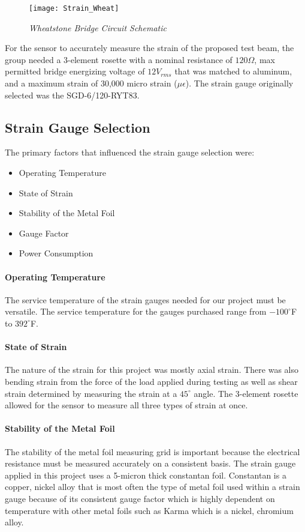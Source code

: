 \begin{figure}[H]
\centering
\texttt{[image: Strain\_Wheat]}
\caption{\textit{Wheatstone Bridge Circuit Schematic}\cite{OmegaEngineeering:2013}}
\label{fig:STRAIN_Wheat}
\end{figure}

\indent For the sensor to accurately measure the strain of the proposed test beam, the group needed a 3-element rosette with a nominal resistance of $120\Omega$, max permitted bridge energizing voltage of $12V_{rms}$ that was matched to aluminum, and a maximum strain of 30,000 micro strain ($\mu \epsilon$). The strain gauge originally selected was the SGD-6/120-RYT83.

\subsection{Strain Gauge Selection}
\indent The primary factors that influenced the strain gauge selection were:

\begin{itemize}
\item Operating Temperature
\item State of Strain
\item Stability of the Metal Foil
\item Gauge Factor
\item Power Consumption
\end{itemize}

\paragraph{Operating Temperature}
\indent The service temperature of the strain gauges needed for our project must be versatile. The service temperature for the gauges purchased range from $-100^{\circ}$F to $392^{\circ}$F. 
\paragraph{State of Strain}
\indent The nature of the strain for this project was mostly axial strain. There was also bending strain from the force of the load applied during testing as well as shear strain determined by measuring the strain at a $45^{\circ}$ angle. The 3-element rosette allowed for the sensor to measure all three types of strain at once.
\paragraph{Stability of the Metal Foil}
\indent The stability of the metal foil measuring grid is important because the electrical resistance must be measured accurately on a consistent basis. The strain gauge applied in this project uses a 5-micron thick constantan foil. Constantan is a copper, nickel alloy that is most often the type of metal foil used within a strain gauge because of its consistent gauge factor which is highly dependent on temperature with other metal foils such as Karma which is a nickel, chromium alloy.
